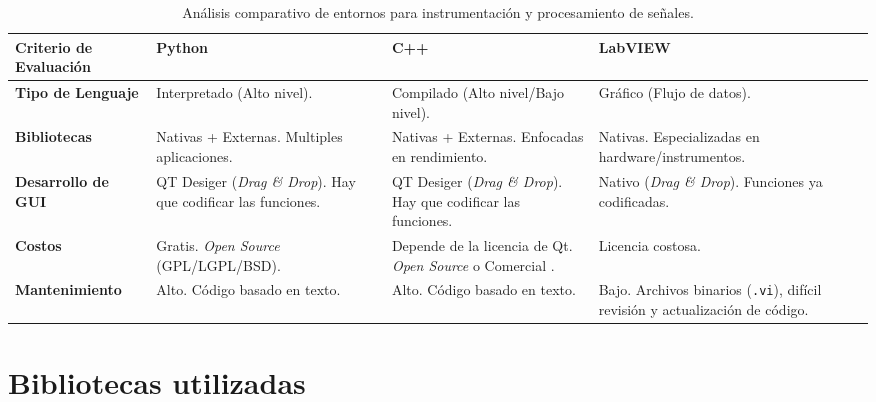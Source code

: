 \begin{table}[h!]
    \centering
    \begin{tabularx}{\textwidth}{>{\hsize=0.8\hsize\raggedright\arraybackslash}X >{\hsize=1.1\hsize\raggedright\arraybackslash}X >{\hsize=1.1\hsize\raggedright\arraybackslash}X >{\hsize=1\hsize\raggedright\arraybackslash}X}
        \toprule
        \textbf{Criterio de Evaluación}      & \textbf{Python}                                         & \textbf{C++}                                           & \textbf{LabVIEW} \\ \midrule
        \textbf{Tipo de Lenguaje}       & Interpretado (Alto nivel).                                                            & Compilado (Alto nivel/Bajo nivel).                                                    & Gráfico (Flujo de datos). \\ \addlinespace
        \textbf{Bibliotecas}       & Nativas + Externas. Multiples aplicaciones.                                                            & Nativas + Externas. Enfocadas en rendimiento.                                                    & Nativas. Especializadas en hardware/instrumentos. \\ \addlinespace
        \textbf{Desarrollo de GUI}           & QT Desiger (\textit{Drag \& Drop}). Hay que codificar las funciones.           & QT Desiger (\textit{Drag \& Drop}). Hay que codificar las funciones.   & Nativo (\textit{Drag \& Drop}). Funciones ya codificadas. \\ \addlinespace
        \textbf{Costos}     & Gratis. \textit{Open Source} (GPL/LGPL/BSD).                 & Depende de la licencia de Qt. \textit{Open Source} o Comercial . & Licencia costosa. \\\addlinespace
        \textbf{Mantenimiento} & Alto. Código basado en texto.                                                      & Alto. Código basado en texto.                                              & Bajo. Archivos binarios (\texttt{.vi}), difícil revisión y actualización de código. \\ \bottomrule
    \end{tabularx}
    \caption{Análisis comparativo de entornos para instrumentación y procesamiento de señales.}
\end{table}

\section{Bibliotecas utilizadas}

